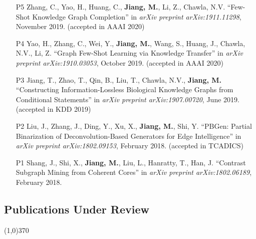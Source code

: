 \documentclass[10pt]{article}
\newenvironment{myindentpar}[1]%
{\begin{list}{}%
         {\setlength{\leftmargin}{#1}}%
         \item[]%
}
{\end{list}}
\newcounter{list}
\begin{document}
\begin{myindentpar}{0.00cm}
\begin{enumerate}[leftmargin=.5cm]
\item[P5] Zhang, C., Yao, H., Huang, C., \textbf{Jiang, M.}, Li, Z., Chawla, N.V. ``Few-Shot Knowledge Graph Completion'' in \textit{arXiv preprint arXiv:1911.11298}, November 2019. (accepted in AAAI 2020)

\item[P4] Yao, H., Zhang, C., Wei, Y., \textbf{Jiang, M.}, Wang, S., Huang, J., Chawla, N.V., Li, Z. ``Graph Few-Shot Learning via Knowledge Transfer'' in \textit{arXiv preprint arXiv:1910.03053}, October 2019. (accepted in AAAI 2020)
		
\item[P3] Jiang, T., Zhao, T., Qin, B., Liu, T., Chawla, N.V., \textbf{Jiang, M.} ``Constructing Information-Lossless Biological Knowledge Graphs from Conditional Statements'' in \textit{arXiv preprint arXiv:1907.00720}, June 2019. (accepted in KDD 2019)
		
\item[P2] Liu, J., Zhang, J., Ding, Y., Xu, X., \textbf{Jiang, M.}, Shi, Y. ``PBGen: Partial Binarization of Deconvolution-Based Generators for Edge Intelligence'' in \textit{arXiv preprint arXiv:1802.09153}, February 2018. (accepted in TCADICS)
		
\item[P1] Shang, J., Shi, X., \textbf{Jiang, M.}, Liu, L., Hanratty, T., Han, J. ``Contrast Subgraph Mining from Coherent Cores'' in \textit{arXiv preprint arXiv:1802.06189}, February 2018.

\end{enumerate}

\end{myindentpar}

\subsection{\sc Publications Under Review}
\vspace{-0.4cm} \line(1,0){370} \vspace{-0.1cm}
\end{document}
